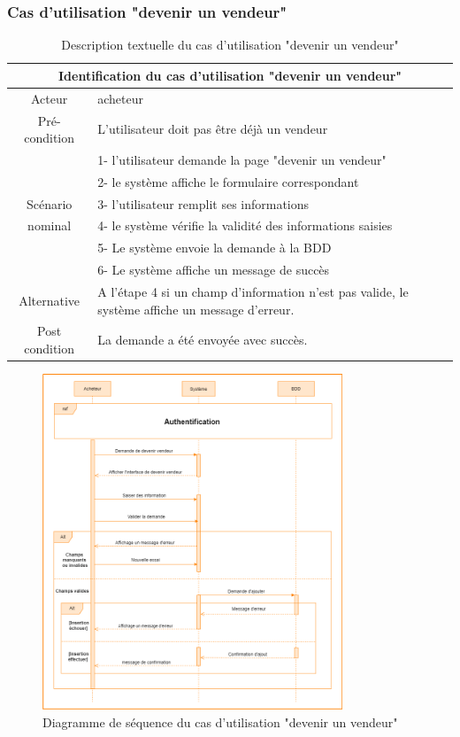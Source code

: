 \documentclass[edit,12pt,a4paper,ChapStyle,oneside,doubleinterligne]{report}
\begin{document}
\subsubsection{Cas d'utilisation "devenir un vendeur"}
\begin{table}[h!]
    \centering
    \begin{tabular}{|c|m{10cm}|}
    \hline
         \multicolumn{2}{|c|}{Identification du cas d'utilisation "devenir un vendeur" }\\
         \hline
         Acteur & acheteur\\
         \hline
         Pré-condition & L’utilisateur doit pas être déjà un vendeur\\
         \hline
          & 1- l'utilisateur demande la page "devenir un vendeur"\\
          & 2- le système affiche le formulaire correspondant\\
         Scénario&3- l'utilisateur remplit ses informations \\
         nominal& 4- le système vérifie la validité des informations saisies \\
          & 5- Le système envoie la demande à la BDD \\
          & 6- Le système affiche un message de succès\\
         \hline
         Alternative  & A l’étape 4 si un champ d’information n’est pas valide, le
         système affiche un message d’erreur.\\
         \hline
         Post condition & La demande a été envoyée avec succès. \\
         \hline
    \end{tabular}
    \caption{Description textuelle du cas d'utilisation "devenir un vendeur" }
    \label{tab:cas 3}
\end{table}
\begin{figure}[h!]\label{fig:Diagramme cas 3}
\centering
\includegraphics[width=0.8\textwidth]{images/devenir vendeur.png}
\caption{Diagramme de séquence du cas d'utilisation "devenir un vendeur"}
\end{figure}
\end{document}
